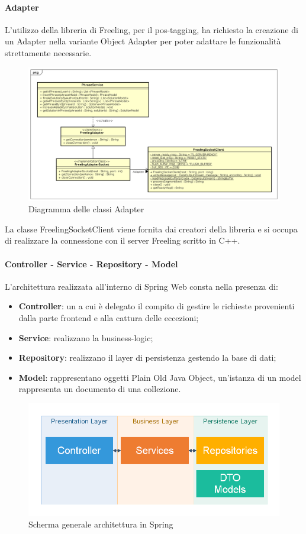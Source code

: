 \paragraph{Adapter}
L'utilizzo della libreria di Freeling, per il pos-tagging, ha richiesto la creazione di un Adapter nella variante Object Adapter per poter adattare le funzionalità strettamente necessarie.
\begin{figure}[H]
\includegraphics[width=17cm]{img/Adapter.png} 
\caption{Diagramma delle classi Adapter}
\end{figure}
La classe FreelingSocketClient viene fornita dai creatori della libreria e si occupa di realizzare la connessione con il server Freeling scritto in C++.
\paragraph{Controller - Service - Repository - Model}
L'architettura realizzata all'interno di Spring Web consta nella presenza di:
\begin{itemize}
\item \textbf{Controller}: un a cui è delegato il compito di gestire le richieste provenienti dalla parte frontend e alla cattura delle eccezioni;
\item \textbf{Service}: realizzano la business-logic;
\item \textbf{Repository}: realizzano il layer di persistenza gestendo la base di dati;
\item \textbf{Model}: rappresentano oggetti  Plain Old Java Object, un'istanza di un model rappresenta un documento di una collezione.
\end{itemize}
\begin{figure}[H]
\centering
\includegraphics[width=14cm]{img/springArch.png}
\caption{Scherma generale architettura in Spring}
\end{figure}

